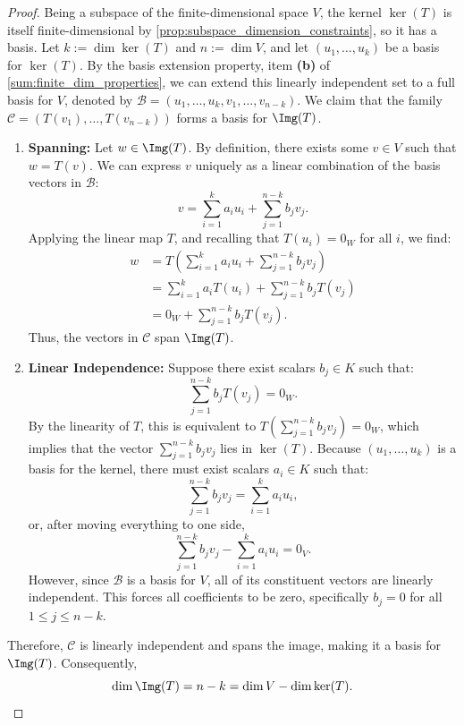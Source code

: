 \begin{proof}
Being a subspace of the finite-di\-men\-sional space $V$, the kernel $\ker(T)$ is itself finite-di\-men\-sional by \cref{prop:subspace_dimension_constraints}, so it has a basis. Let $k := \dim \ker(T)$ and $n := \dim V$, and let $(u_1, \dots, u_k)$ be a basis for $\ker(T)$. By the basis extension property, item \textbf{(b)} of \cref{sum:finite_dim_properties}, we can extend this linearly independent set to a full basis for $V$, denoted by $\mathcal{B} = (u_1, \dots, u_k, v_1, \dots, v_{n-k})$. We claim that the family $\mathcal{C} = (T(v_1), \dots, T(v_{n-k}))$ forms a basis for $\Img(T)$.

\begin{enumerate}
    \item \textbf{Spanning:} Let $w \in \Img(T)$. By definition, there exists some $v \in V$ such that $w = T(v)$. We can express $v$ uniquely as a linear combination of the basis vectors in $\mathcal{B}$:
    \[
    v = \sum_{i=1}^k a_i u_i + \sum_{j=1}^{n-k} b_j v_j.
    \]
    Applying the linear map $T$, and recalling that $T(u_i) = 0_W$ for all $i$, we find:
    \begin{align*}
    w &= T\left( \sum_{i=1}^k a_i u_i + \sum_{j=1}^{n-k} b_j v_j \right) \\
    &= \sum_{i=1}^k a_i T(u_i) + \sum_{j=1}^{n-k} b_j T(v_j) \\
    &= 0_W + \sum_{j=1}^{n-k} b_j T(v_j).
    \end{align*}
    Thus, the vectors in $\mathcal{C}$ span $\Img(T)$.
    
    \item \textbf{Linear Independence:} Suppose there exist scalars $b_j \in K$ such that:
    \[
    \sum_{j=1}^{n-k} b_j T(v_j) = 0_W.
    \]
    By the linearity of $T$, this is equivalent to $T\left( \sum_{j=1}^{n-k} b_j v_j \right) = 0_W$, which implies that the vector $\sum_{j=1}^{n-k} b_j v_j$ lies in $\ker(T)$. Because $(u_1, \dots, u_k)$ is a basis for the kernel, there must exist scalars $a_i \in K$ such that:
    \[
    \sum_{j=1}^{n-k} b_j v_j = \sum_{i=1}^k a_i u_i,
    \]
    or, after moving everything to one side,
    \[
    \sum_{j=1}^{n-k} b_j v_j - \sum_{i=1}^k a_i u_i = 0_V.
    \]
    However, since $\mathcal{B}$ is a basis for $V$, all of its constituent vectors are linearly independent. This forces all coefficients to be zero, specifically $b_j = 0$ for all $1 \le j \le n-k$. 
\end{enumerate}

Therefore, $\mathcal{C}$ is linearly independent and spans the image, making it a basis for $\Img(T)$. Consequently,
\[
\dim \Img(T) = n - k = \dim V - \dim \ker(T). \qedhere
\]
\end{proof}

